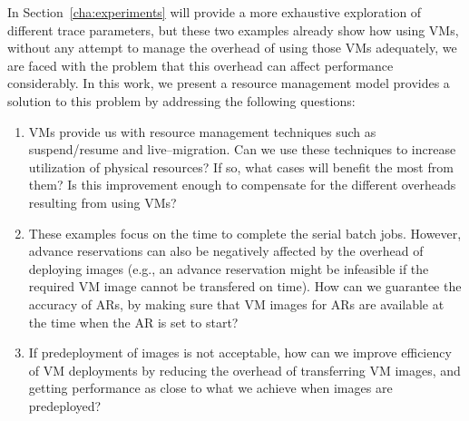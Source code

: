 In Section~\ref{cha:experiments} will provide a more exhaustive exploration of different trace parameters, but these two examples already show how using VMs, without any attempt to manage the overhead of using those VMs adequately, we are faced with the problem that this overhead can affect performance considerably. In this work, we present a resource management model provides a solution to this problem by addressing the following questions:

\begin{enumerate}
\item VMs provide us with resource management techniques such as suspend/resume and live--migration. Can we use these techniques to increase utilization of physical resources? If so, what cases will benefit the most from them? Is this improvement enough to compensate for the different overheads resulting from using VMs?
\item These examples focus on the time to complete the serial batch jobs. However, advance reservations can also be negatively affected by the overhead of deploying images (e.g., an advance reservation might be infeasible if the required VM image cannot be transfered on time). How can we guarantee the accuracy of ARs, by  making sure that VM images for ARs are available at the time when the AR is set to start?
\item If predeployment of images is not acceptable, how can we improve efficiency of VM deployments by reducing the overhead of transferring VM images, and getting performance as close to what we achieve when images are predeployed?
\end{enumerate}
